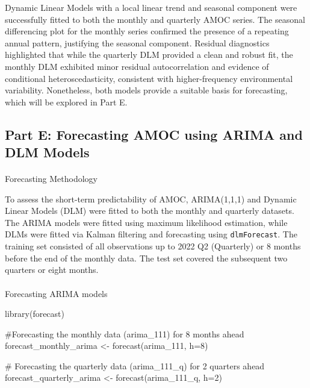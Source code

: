 \documentclass[
  11pt,
]{article}
\makeatletter
\let\oldparagraph\paragraph
\renewcommand{\paragraph}{
    \@ifstar
      \xxxParagraphStar
      \xxxParagraphNoStar
  }
\newcommand{\xxxParagraphStar}[1]{\oldparagraph*{#1}\mbox{}}
\newcommand{\xxxParagraphNoStar}[1]{\oldparagraph{#1}\mbox{}}
\newenvironment{Shaded}{\begin{snugshade}}{\end{snugshade}}
\newcommand{\AttributeTok}[1]{\textcolor[rgb]{0.40,0.45,0.13}{#1}}
\newcommand{\CommentTok}[1]{\textcolor[rgb]{0.37,0.37,0.37}{#1}}
\newcommand{\DecValTok}[1]{\textcolor[rgb]{0.68,0.00,0.00}{#1}}
\newcommand{\FunctionTok}[1]{\textcolor[rgb]{0.28,0.35,0.67}{#1}}
\newcommand{\NormalTok}[1]{\textcolor[rgb]{0.00,0.23,0.31}{#1}}
\newcommand{\OtherTok}[1]{\textcolor[rgb]{0.00,0.23,0.31}{#1}}
\makeatother
\begin{document}
Dynamic Linear Models with a local linear trend and seasonal component
were successfully fitted to both the monthly and quarterly AMOC series.
The seasonal differencing plot for the monthly series confirmed the
presence of a repeating annual pattern, justifying the seasonal
component. Residual diagnostics highlighted that while the quarterly DLM
provided a clean and robust fit, the monthly DLM exhibited minor
residual autocorrelation and evidence of conditional heteroscedasticity,
consistent with higher-frequency environmental variability. Nonetheless,
both models provide a suitable basis for forecasting, which will be
explored in Part E.

\subsection{Part E: Forecasting AMOC using ARIMA and DLM
Models}\label{part-e-forecasting-amoc-using-arima-and-dlm-models}

\paragraph{Forecasting Methodology}\label{forecasting-methodology}

To assess the short-term predictability of AMOC, ARIMA(1,1,1) and
Dynamic Linear Models (DLM) were fitted to both the monthly and
quarterly datasets. The ARIMA models were fitted using maximum
likelihood estimation, while DLMs were fitted via Kalman filtering and
forecasting using \texttt{dlmForecast}. The training set consisted of
all observations up to 2022 Q2 (Quarterly) or 8 months before the end of
the monthly data. The test set covered the subsequent two quarters or
eight months.

\paragraph{Forecasting ARIMA models}\label{forecasting-arima-models}

\begin{Shaded}
\begin{Highlighting}[]
\FunctionTok{library}\NormalTok{(forecast)}

\CommentTok{\#Forecasting the monthly data (arima\_111) for 8 months ahead}
\NormalTok{forecast\_monthly\_arima }\OtherTok{\textless{}{-}} \FunctionTok{forecast}\NormalTok{(arima\_111, }\AttributeTok{h=}\DecValTok{8}\NormalTok{)}

\CommentTok{\# Forecasting the quarterly data (arima\_111\_q) for 2 quarters ahead}
\NormalTok{forecast\_quarterly\_arima }\OtherTok{\textless{}{-}} \FunctionTok{forecast}\NormalTok{(arima\_111\_q, }\AttributeTok{h=}\DecValTok{2}\NormalTok{)}
\end{Highlighting}
\end{Shaded}
\end{document}
